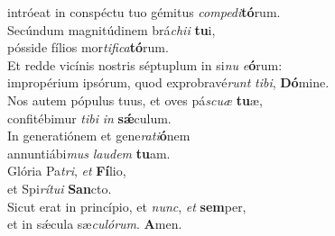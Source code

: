\oddverse intróeat in conspéctu tuo gémitus \textit{com}\textit{pe}\textit{di}\textbf{tó}rum.\\
\evenverse Secúndum magnitúdinem brá\textit{chi}\textit{i} \textbf{tu}i,~\*\\
\evenverse pósside fílios mor\textit{ti}\textit{fi}\textit{ca}\textbf{tó}rum.\\
\oddverse Et redde vicínis nostris séptuplum in si\textit{nu} \textit{e}\textbf{ó}rum:~\*\\
\oddverse impropérium ipsórum, quod exprobravé\textit{runt} \textit{ti}\textit{bi}, \textbf{Dó}mine.\\
\evenverse Nos autem pópulus tuus, et oves pá\textit{scu}\textit{æ} \textbf{tu}æ,~\*\\
\evenverse confitébimur \textit{ti}\textit{bi} \textit{in} \textbf{sǽ}culum.\\
\oddverse In generatiónem et gene\textit{ra}\textit{ti}\textbf{ó}nem~\*\\
\oddverse annuntiábi\textit{mus} \textit{lau}\textit{dem} \textbf{tu}am.\\
\evenverse Glória Pa\textit{tri}, \textit{et} \textbf{Fí}lio,~\*\\
\evenverse et Spi\textit{rí}\textit{tu}\textit{i} \textbf{San}cto.\\
\oddverse Sicut erat in princípio, et \textit{nunc}, \textit{et} \textbf{sem}per,~\*\\
\oddverse et in sǽcula sæ\textit{cu}\textit{ló}\textit{rum}. \textbf{A}men.\\
